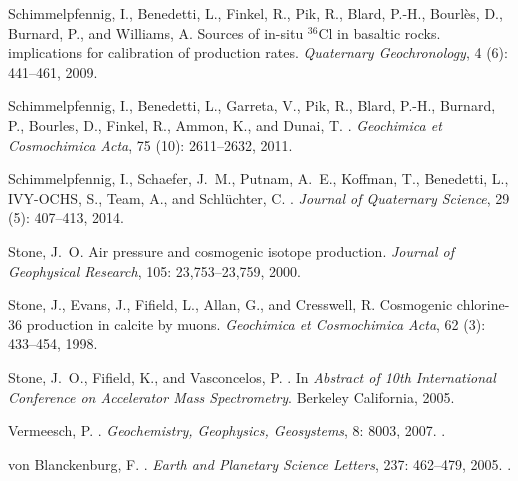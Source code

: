 \documentclass[titlepage]{article}
\begin{document}
\begin{thebibliography}{25}
Schimmelpfennig, I., Benedetti, L., Finkel, R., Pik, R., Blard, P.-H.,
  Bourl{\`e}s, D., Burnard, P., and Williams, A.
\newblock Sources of in-situ $^{36}${C}l in basaltic rocks. implications for
  calibration of production rates.
\newblock \emph{Quaternary Geochronology}, 4 (6): 441--461,
  2009.

Schimmelpfennig, I., Benedetti, L., Garreta, V., Pik, R., Blard, P.-H.,
  Burnard, P., Bourles, D., Finkel, R., Ammon, K., and Dunai, T.
.
\newblock \emph{Geochimica et Cosmochimica Acta}, 75 (10):
  2611--2632, 2011.

Schimmelpfennig, I., Schaefer, J.~M., Putnam, A.~E., Koffman, T., Benedetti,
  L., IVY-OCHS, S., Team, A., and Schl{\"u}chter, C.
.
\newblock \emph{Journal of Quaternary Science}, 29 (5):
  407--413, 2014.

Stone, J.~O.
\newblock Air pressure and cosmogenic isotope production.
\newblock \emph{Journal of Geophysical Research}, 105: 23,753--23,759,
  2000.

Stone, J., Evans, J., Fifield, L., Allan, G., and Cresswell, R.
\newblock Cosmogenic chlorine-36 production in calcite by muons.
\newblock \emph{Geochimica et Cosmochimica Acta}, 62 (3):
  433--454, 1998.

Stone, J.~O., Fifield, K., and Vasconcelos, P.
.
\newblock In \emph{Abstract of 10th International Conference on Accelerator
  Mass Spectrometry}. Berkeley California, 2005.

{Vermeesch}, P.
.
\newblock \emph{Geochemistry, Geophysics, Geosystems}, 8: 8003, 2007.
\newblock {}.

{von Blanckenburg}, F.
.
\newblock \emph{Earth and Planetary Science Letters}, 237: 462--479,
  2005.
\newblock {}.

\end{thebibliography}
\end{document}
